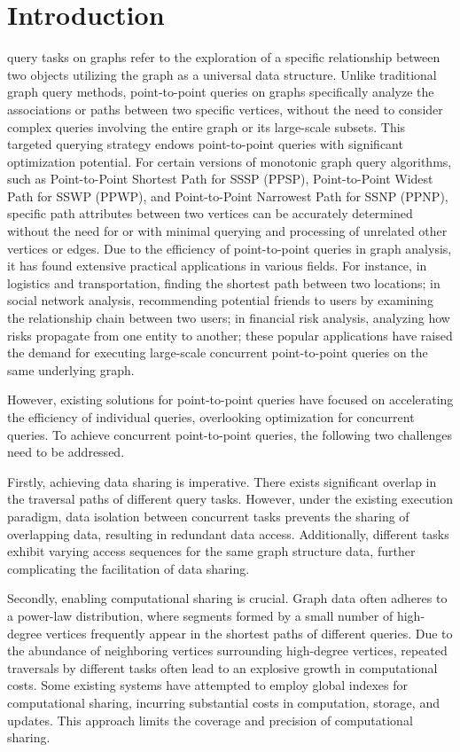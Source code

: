 \documentclass[lettersize,journal]{IEEEtran} %
\begin{document}
\section{Introduction}
 query tasks on graphs refer to the exploration of a specific relationship between two objects utilizing the graph as a universal data structure. Unlike traditional graph query methods, point-to-point queries on graphs specifically analyze the associations or paths between two specific vertices, without the need to consider complex queries involving the entire graph or its large-scale subsets. This targeted querying strategy endows point-to-point queries with significant optimization potential. For certain versions of monotonic graph query algorithms, such as Point-to-Point Shortest Path for SSSP (PPSP), Point-to-Point Widest Path for SSWP (PPWP), and Point-to-Point Narrowest Path for SSNP (PPNP), specific path attributes between two vertices can be accurately determined without the need for or with minimal querying and processing of unrelated other vertices or edges. Due to the efficiency of point-to-point queries in graph analysis, it has found extensive practical applications in various fields. For instance, in logistics and transportation, finding the shortest path between two locations; in social network analysis, recommending potential friends to users by examining the relationship chain between two users; in financial risk analysis, analyzing how risks propagate from one entity to another; these popular applications have raised the demand for executing large-scale concurrent point-to-point queries on the same underlying graph. 

However, existing solutions for point-to-point queries have focused on accelerating the efficiency of individual queries, overlooking optimization for concurrent queries. To achieve concurrent point-to-point queries, the following two challenges need to be addressed.

Firstly, achieving data sharing is imperative. There exists significant overlap in the traversal paths of different query tasks. However, under the existing execution paradigm, data isolation between concurrent tasks prevents the sharing of overlapping data, resulting in redundant data access. Additionally, different tasks exhibit varying access sequences for the same graph structure data, further complicating the facilitation of data sharing.

Secondly, enabling computational sharing is crucial. Graph data often adheres to a power-law distribution, where segments formed by a small number of high-degree vertices frequently appear in the shortest paths of different queries. Due to the abundance of neighboring vertices surrounding high-degree vertices, repeated traversals by different tasks often lead to an explosive growth in computational costs. Some existing systems have attempted to employ global indexes for computational sharing, incurring substantial costs in computation, storage, and updates. This approach limits the coverage and precision of computational sharing.
\end{document}
